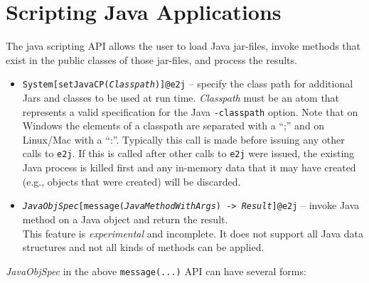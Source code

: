 \section{Scripting Java Applications}

The java scripting API allows the user to load Java jar-files, invoke
methods that exist in the public classes of those jar-files, and process
the results.

\begin{itemize}
\item \texttt{System[setJavaCP(\textnormal{\emph{Classpath}})]@\bs{}e2j} --
  specify the class path for additional Jars and classes to be used at run
  time. \emph{Classpath} must be an atom that represents a valid
  specification for the Java \texttt{-classpath} option.  Note that on
  Windows the elements of a classpath are separated with a ``;'' and on
  Linux/Mac with a ``:''.  Typically this call is made before issuing any
  other calls to \texttt{\bs{}e2j}.  If this is called after other calls to
  \texttt{\bs{}e2j} were issued, the existing Java process is killed first
  and any in-memory data that it may have
  created (e.g., objects that were created) will be discarded.
\item
  \texttt{\textnormal{\emph{JavaObjSpec}}[message(\textnormal{\emph{JavaMethodWithArgs}})
    -> \textnormal{\emph{Result}}]@\bs{}e2j} -- invoke Java method on a
  Java object and return the result.
  \\
  This feature is \emph{experimental} and incomplete. It does not support
  all Java data structures and not all kinds of methods can be applied. 
\end{itemize}
\emph{JavaObjSpec} in the above \texttt{message(...)}   API can have several forms:
